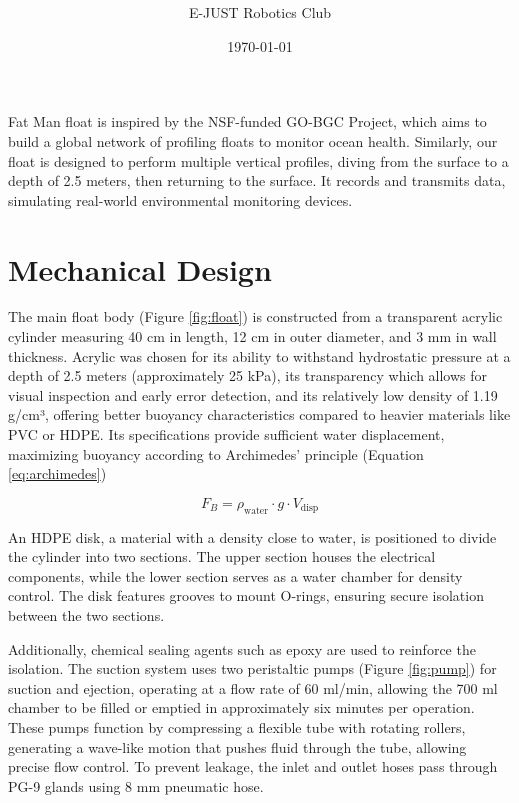 \documentclass[11pt, twocolumn]{article}
\title{\Huge \color{mypink3}{ROV Document}  \vspace{0.5cm}}
\author{\Large E-JUST Robotics Club \normalsize \hspace{0.5cm} }
\date{\today}
\begin{document}
\twocolumn

Fat Man float is inspired by the NSF-funded GO-BGC Project, which aims to build a global network of profiling floats to monitor ocean health. Similarly, our float is designed to perform multiple vertical profiles, diving from the surface to a depth of 2.5 meters, then returning to the surface. It records and transmits data, simulating real-world environmental monitoring devices.

\section{Mechanical Design}

The main float body (Figure \ref{fig:float}) is constructed from a transparent acrylic cylinder measuring 40 cm in length, 12 cm in outer diameter, and 3 mm in wall thickness. Acrylic was chosen for its ability to withstand hydrostatic pressure at a depth of 2.5 meters (approximately 25 kPa), its transparency which allows for visual inspection and early error detection, and its relatively low density of 1.19 g/cm³, offering better buoyancy characteristics compared to heavier materials like PVC or HDPE. Its specifications provide sufficient water displacement, maximizing buoyancy according to Archimedes' principle (Equation \ref{eq:archimedes})

\begin{equation}
\label{eq:archimedes}
    F_B = \rho_{\text{water}} \cdot g \cdot V_{\text{disp}}
\end{equation}

An HDPE disk, a material with a density close to water, is positioned to divide the cylinder into two sections. The upper section houses the electrical components, while the lower section serves as a water chamber for density control. The disk features grooves to mount O-rings, ensuring secure isolation between the two sections. 

\hspace{10pt} Additionally, chemical sealing agents such as epoxy are used to reinforce the isolation. The suction system uses two peristaltic pumps (Figure \ref{fig:pump}) for suction and ejection, operating at a flow rate of 60 ml/min, allowing the 700 ml chamber to be filled or emptied in approximately six minutes per operation. These pumps function by compressing a flexible tube with rotating rollers, generating a wave-like motion that pushes fluid through the tube, allowing precise flow control. To prevent leakage, the inlet and outlet hoses pass through PG-9 glands using 8 mm pneumatic hose. 
\end{document}
